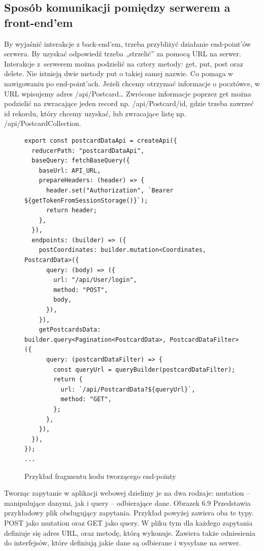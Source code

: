 \documentclass[a4paper,twoside,12pt]{book}
\begin{document}
\subsection{Sposób komunikacji pomiędzy serwerem a front-end’em}
By wyjaśnić interakcje z back-end’em, trzeba przybliżyć działanie end-point’ów serwera. By uzyskać odpowiedź trzeba „strzelić” za pomocą URL na serwer. Interakcje z~serwerem można podzielić na cztery metody: get, put, post oraz delete. Nie istnieją dwie metody put o takiej samej nazwie. Co pomaga w nawigowaniu po end-point’ach. Jeżeli chcemy otrzymać informacje o pocztówce, w URL wpisujemy adres /api/Postcard… 
Zwrócone informacje poprzez get można podzielić na zwracające jeden record np. /api/Postcard/{id}, gdzie trzeba zawrzeć id rekordu, który chcemy uzyskać, lub zwracające listę np. /api/PostcardCollection.
\begin{figure}[H]
    \begin{lstlisting}
export const postcardDataApi = createApi({
  reducerPath: "postcardDataApi",
  baseQuery: fetchBaseQuery({
    baseUrl: API_URL,
    prepareHeaders: (header) => {
      header.set("Authorization", `Bearer ${getTokenFromSessionStorage()}`);
      return header;
    },
  }),
  endpoints: (builder) => ({
    postCoordinates: builder.mutation<Coordinates, PostcardData>({
      query: (body) => ({
        url: "/api/User/login",
        method: "POST",
        body,
      }),
    }),
    getPostcardsData: builder.query<Pagination<PostcardData>, PostcardDataFilter>({
      query: (postcardDataFilter) => {
        const queryUrl = queryBuilder(postcardDataFilter);
        return {
          url: `/api/PostcardData?${queryUrl}`,
          method: "GET",
        };
      },
    }),
  }),
});
...
    \end{lstlisting}
    \caption{Przykład fragmentu kodu tworzącego end-pointy}
    \label{fig:pseudokod:listings}
\end{figure}

Tworząc zapytanie w aplikacji webowej dzielimy je na dwa rodzaje: mutation -- manipulujące danymi, jak i query -- odbierające dane. Obrazek 6.9 Przedstawia przykładowy plik obsługujący zapytania. Przykład powyżej zawiera oba te typy. POST jako mutation oraz GET jako query.  W pliku tym dla każdego zapytania definiuje się adres URL, oraz metodę, którą wykonuje. Zawiera także odniesienia do interfejsów, które definiują jakie dane są odbierane i wysyłane na serwer.
\end{document}
